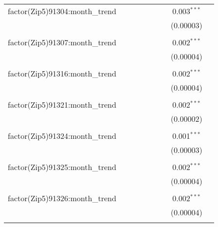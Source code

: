 \begin{table}[H]
{\begin{tabular}{@{\extracolsep{5pt}}lcccccccc}
  factor(Zip5)91304:month\_trend &  &  &  &  &  &  & 0.003$^{***}$ &  \\  

   &  &  &  &  &  &  & (0.00003) &  \\  

   & & & & & & & & \\  

  factor(Zip5)91307:month\_trend &  &  &  &  &  &  & 0.002$^{***}$ &  \\  

   &  &  &  &  &  &  & (0.00004) &  \\  

   & & & & & & & & \\  

  factor(Zip5)91316:month\_trend &  &  &  &  &  &  & 0.002$^{***}$ &  \\  

   &  &  &  &  &  &  & (0.00004) &  \\  

   & & & & & & & & \\  

  factor(Zip5)91321:month\_trend &  &  &  &  &  &  & 0.002$^{***}$ &  \\  

   &  &  &  &  &  &  & (0.00002) &  \\  

   & & & & & & & & \\  

  factor(Zip5)91324:month\_trend &  &  &  &  &  &  & 0.001$^{***}$ &  \\  

   &  &  &  &  &  &  & (0.00003) &  \\  

   & & & & & & & & \\  

  factor(Zip5)91325:month\_trend &  &  &  &  &  &  & 0.002$^{***}$ &  \\  

   &  &  &  &  &  &  & (0.00004) &  \\  

   & & & & & & & & \\  

  factor(Zip5)91326:month\_trend &  &  &  &  &  &  & 0.002$^{***}$ &  \\  

   &  &  &  &  &  &  & (0.00004) &  \\  

   & & & & & & & & \\  


\end{tabular}}
\end{table}
